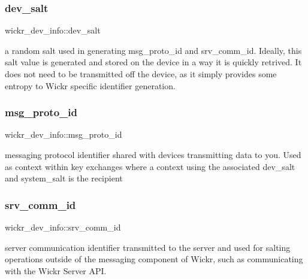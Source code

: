 \subsubsection{\texorpdfstring{dev\_salt}{dev\_salt}}
{\footnotesize\ttfamily wickr\+\_\+dev\+\_\+info\+::dev\+\_\+salt}

a random salt used in generating \textquotesingle{}msg\+\_\+proto\+\_\+id\textquotesingle{} and \textquotesingle{}srv\+\_\+comm\+\_\+id\textquotesingle{}. Ideally, this salt value is generated and stored on the device in a way it is quickly retrived. It does not need to be transmitted off the device, as it simply provides some entropy to Wickr specific identifier generation. \mbox{\label{structwickr__dev__info_a864ad03c4d10f51fe6251059007276d2}} 
\subsubsection{\texorpdfstring{msg\_proto\_id}{msg\_proto\_id}}
{\footnotesize\ttfamily wickr\+\_\+dev\+\_\+info\+::msg\+\_\+proto\+\_\+id}

messaging protocol identifier shared with devices transmitting data to you. Used as context within key exchanges where a context using the associated \textquotesingle{}dev\+\_\+salt\textquotesingle{} and \textquotesingle{}system\+\_\+salt\textquotesingle{} is the recipient \mbox{\label{structwickr__dev__info_af5f2ff06ae74fcec85106f6ffd77c008}} 
\subsubsection{\texorpdfstring{srv\_comm\_id}{srv\_comm\_id}}
{\footnotesize\ttfamily wickr\+\_\+dev\+\_\+info\+::srv\+\_\+comm\+\_\+id}

server communication identifier transmitted to the server and used for salting operations outside of the messaging component of Wickr, such as communicating with the Wickr Server A\+PI. \mbox{\label{structwickr__dev__info_a084d0cd9e73d9f74f62c9e9abb85436f}} 
